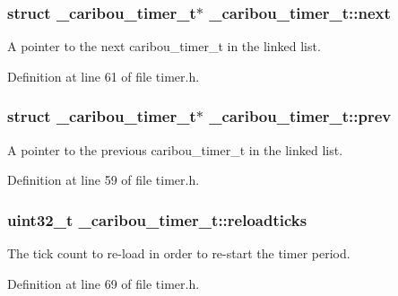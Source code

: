\hypertarget{struct__caribou__timer__t_a922fab9a09a701c3ac7273c9548a4afa}{
\subsubsection[{next}]{\setlength{\rightskip}{0pt plus 5cm}struct {\bf \-\_\-caribou\-\_\-timer\-\_\-t}$\ast$ \-\_\-caribou\-\_\-timer\-\_\-t\-::next}}\label{struct__caribou__timer__t_a922fab9a09a701c3ac7273c9548a4afa}


A pointer to the next caribou\-\_\-timer\-\_\-t in the linked list. 



Definition at line 61 of file timer.\-h.

\hypertarget{struct__caribou__timer__t_a711f3f84b0ef799261b12d7c0a6d4132}{
\subsubsection[{prev}]{\setlength{\rightskip}{0pt plus 5cm}struct {\bf \-\_\-caribou\-\_\-timer\-\_\-t}$\ast$ \-\_\-caribou\-\_\-timer\-\_\-t\-::prev}}\label{struct__caribou__timer__t_a711f3f84b0ef799261b12d7c0a6d4132}


A pointer to the previous caribou\-\_\-timer\-\_\-t in the linked list. 



Definition at line 59 of file timer.\-h.

\hypertarget{struct__caribou__timer__t_a1b66f8c7abf7e00efa3d0adc916b0ecd}{
\subsubsection[{reloadticks}]{\setlength{\rightskip}{0pt plus 5cm}uint32\-\_\-t \-\_\-caribou\-\_\-timer\-\_\-t\-::reloadticks}}\label{struct__caribou__timer__t_a1b66f8c7abf7e00efa3d0adc916b0ecd}


The tick count to re-\/load in order to re-\/start the timer period. 



Definition at line 69 of file timer.\-h.

